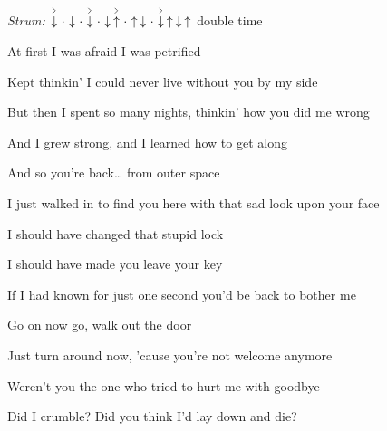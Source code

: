 \begin{song}


\begin{headerbox}
\RaiseBoxWithAccents
\textit{Strum:} $\AccentDown\Miss\Down\Miss\AccentDown\Miss\Down\AccentUp \Miss\Up\Down\Miss\AccentDown\Up\Down\Up$ double time
\end{headerbox}

\begin{hchordbox}
\end{hchordbox}

\Large

\bigskip

 \par
\smallskip
At first I was afraid I was petrified \par
Kept thinkin' I could never live without you by my side \par
But then I spent so many nights, thinkin' how you did me wrong \par
And I grew strong, and I learned how to get along \par

\bigskip

And so you're back… from outer space \par
I just walked in to find you here with that sad look upon your face \par
I should have changed that stupid lock \par
I should have made you leave your key \par
If I had known for just one second you'd be back to bother me \par

\bigskip

\begin{chorusbox}{\PrechorusAndChorus}
Go on now go, walk out the door \par
Just turn around now, 'cause you're not welcome anymore \par
{} Weren't you the one who tried to hurt me with goodbye \par
Did I crumble? Did you think I'd lay down and die? \par


\end{chorusbox}
\end{song}
